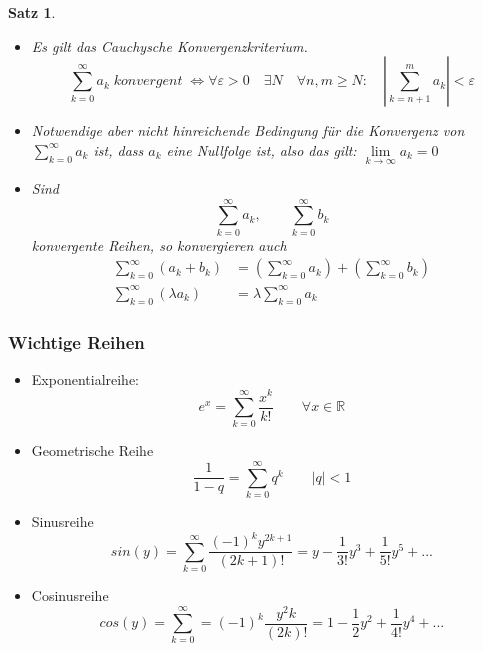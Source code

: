 \documentclass[12pt,a4paper]{article}%
\newtheorem{satz}{Satz}[section]
\numberwithin{equation}{section}
\newcommand{\R}{\mathbb{R}} %
\numberwithin{equation}{subsection}
\begin{document}
  \begin{satz} $\;$\newline \vspace{-0.5cm}
  \begin{itemize}
  \item[a) ] Es gilt das Cauchysche Konvergenzkriterium.
    \begin{equation}
      \sum\limits_{k=0}^{\infty} a_k \; konvergent \; \Leftrightarrow \forall \varepsilon > 0 \quad \exists N \quad \forall n,m \geq N: \quad \left| \sum\limits_{k = n+1}^m a_k \right| < \varepsilon
    \end{equation}
    \item[b) ] Notwendige aber nicht hinreichende Bedingung für die Konvergenz von $\sum\limits_{k=0}^{\infty} a_k$ ist, dass $a_k$ eine Nullfolge ist, also das gilt: $\lim\limits_{k \rightarrow \infty} a_k = 0$
    \item[c) ] Sind 
    \begin{equation*}
      \sum\limits_{k=0}^{\infty} a_k, \qquad \sum\limits_{k=0}^{\infty} b_k
    \end{equation*}
    konvergente Reihen, so konvergieren auch
    \begin{align*}
    \sum\limits_{k=0}^{\infty} \left( a_k + b_k\right) &= \left(\sum\limits_{k=0}^{\infty} a_k\right) + \left(\sum\limits_{k=0}^{\infty} b_k\right) \\
    \sum\limits_{k=0}^{\infty} \left( \lambda a_k\right) &= \lambda \sum\limits_{k=0}^{\infty} a_k
    \end{align*}
  \end{itemize}
  \end{satz}
  
	  \subsubsection{Wichtige Reihen}
	  \begin{itemize}
	    \item Exponentialreihe:
	    \begin{equation}
	      e^x = \sum\limits_{k=0}^\infty \frac{x^k}{k!} \qquad \forall x \in \R
	    \end{equation}
	    \item Geometrische Reihe
	    \begin{equation}
	      \frac{1}{1-q} = \sum\limits_{k = 0}^\infty q^k \qquad |q| < 1
	    \end{equation}
	    \item Sinusreihe
	    \begin{equation}
	      sin(y) = \sum\limits_{k = 0}^\infty \frac{(-1)^k y^{2k+1}}{(2k+1)!} = y -\frac{1}{3!}y^3 + \frac{1}{5!}y^5 + ...
	    \end{equation}
	    \item Cosinusreihe
	    \begin{equation}
	      cos(y) = \sum\limits_{k = 0}^\infty = (-1)^k \frac{y^2k}{(2k)!} = 1 - \frac{1}{2}y^2 + \frac{1}{4!}y^4 + ...
	    \end{equation}
	  \end{itemize}
	  
\end{document}
